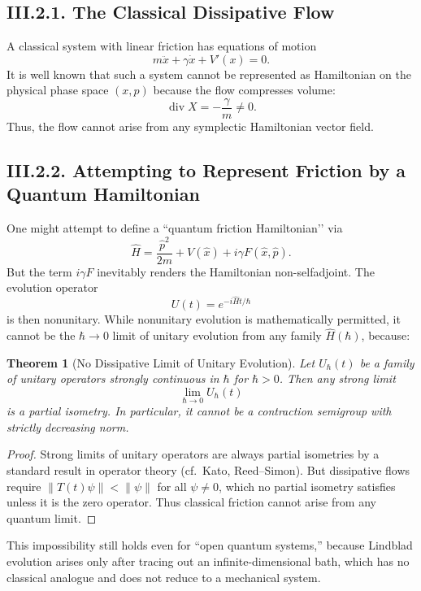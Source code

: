\documentclass[12pt,oneside]{book}
\theoremstyle{plain}
\newtheorem{theorem}{Theorem}[chapter]
\theoremstyle{definition}
\begin{document}
\subsection*{III.2.1. The Classical Dissipative Flow}

A classical system with linear friction has equations of motion
\[
m\ddot x + \gamma \dot x + V'(x)=0.
\]
It is well known that such a system cannot be represented as Hamiltonian on
the physical phase space $(x,p)$ because the flow compresses volume:
\[
\operatorname{div} X = -\frac{\gamma}{m}\neq 0.
\]
Thus, the flow cannot arise from any symplectic Hamiltonian vector field.

\subsection*{III.2.2. Attempting to Represent Friction by a Quantum Hamiltonian}

One might attempt to define a “quantum friction Hamiltonian’’ via
\[
\widehat{H} = \frac{\hat p^2}{2m} + V(\hat x) + i\gamma F(\hat x,\hat p).
\]
But the term $i\gamma F$ inevitably renders the Hamiltonian non-selfadjoint.
The evolution operator
\[
U(t)=e^{-i\widehat{H}t/\hbar}
\]
is then nonunitary. While nonunitary evolution is mathematically permitted,
it cannot be the $\hbar\to 0$ limit of unitary evolution from any family
$\widehat{H}(\hbar)$, because:

\begin{theorem}[No Dissipative Limit of Unitary Evolution]
Let $U_\hbar(t)$ be a family of unitary operators strongly continuous in
$\hbar$ for $\hbar>0$. Then any strong limit
\[
\lim_{\hbar\to 0} U_\hbar(t)
\]
is a \emph{partial isometry}. In particular, it cannot be a contraction
semigroup with strictly decreasing norm.
\end{theorem}

\begin{proof}
Strong limits of unitary operators are always partial isometries by a
standard result in operator theory (cf.\ Kato, Reed–Simon). But dissipative
flows require $\|T(t)\psi\|<\|\psi\|$ for all $\psi\neq 0$, which no partial
isometry satisfies unless it is the zero operator.  
Thus classical friction cannot arise from any quantum limit.
\end{proof}

This impossibility still holds even for “open quantum systems,” because
Lindblad evolution arises only after tracing out an infinite-dimensional bath,
which has no classical analogue and does not reduce to a mechanical system.
\end{document}
